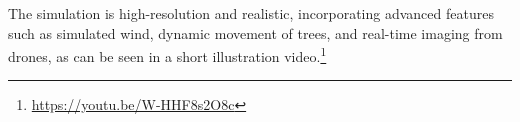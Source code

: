 The simulation is high-resolution and realistic, incorporating advanced features such as simulated wind, dynamic movement of trees, and real-time imaging from drones, as can be seen in a short illustration video.\footnote{\url{https://youtu.be/W-HHF8s2O8c}}  
